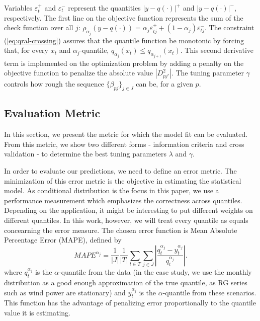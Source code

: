 Variables $\varepsilon^+_t$ and $\varepsilon^-_t$ represent the quantities $|y-q(\cdot)|^+$ and $|y-q(\cdot)|^-$, respectively. The first line on the objective function represents the sum of the check function over all $j$: $ \rho_{\alpha_j}(y-q(\cdot)) = \alpha_j \varepsilon^+_{tj} + (1-\alpha_j) \varepsilon^-_{tj}$. The constraint (\ref{eq:qral-crossing}) assures that the quantile function be monotonic by forcing that, for every $x_t$ and $\alpha_j$-quantile, $q_{\alpha_{j}}(x_t) \leq q_{\alpha_{j+1}}(x_t)$.
This second derivative term is implemented on the optimization problem by adding a penalty on the objective function to penalize the absolute value $|D_{pj'}^{2}|$. The tuning parameter $\gamma$ controls how rough the sequence $\{\beta_{pj}\}_{j \in J}$ can be, for a given $p$.


\subsection{Evaluation Metric}

In this section, we present the metric for which the model fit can be evaluated. From this metric, we show two different forms - information criteria and cross validation - to determine the best tuning parameters $\lambda$ and $\gamma$.

In order to evaluate our predictions, we need to define an error metric. The minimization of this error metric is the objective in estimating the statistical model. 
As conditional distribution is the focus in this paper, we use a performance measurement which emphasizes the correctness across quantiles. Depending on the application, it might be interesting to put different weights on different quantiles. In this work, however, we will treat every quantile as equals concearning the error measure.
The chosen error function is Mean Absolute Percentage Error (MAPE), defined by
\begin{equation}
MAPE^{\alpha_j}= \frac{1}{|J|} \frac{1}{|T|}  \sum_{t \in T} \sum_{j \in J} \left| \frac{q_t^{\alpha_{j}}- y_t^{\alpha_{j}}}{q_t^{\alpha_{j}}}  \right|. 
\end{equation}
where $q_t^{\alpha_{j}}$ is the $\alpha$-quantile from the data (in the case study, we use the monthly distribution as a good enough approximation of the true quantile, as RG series such as wind power are stationary) and $y_t^{\alpha_j}$ is the $\alpha$-quantile from these scenarios.
This function has the advantage of penalizing error proportionally to the quantile value it is estimating. 



